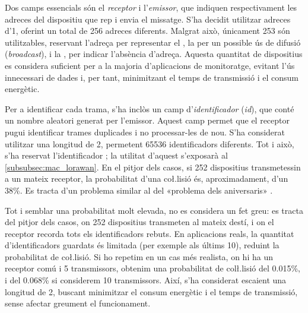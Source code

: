 \documentclass{tfgitic}[2024/07/01]
\begin{document}
Dos camps essencials són el \emph{receptor} i l'\emph{emissor}, que indiquen respectivament les adreces del dispositiu que rep i envia el missatge. S'ha decidit utilitzar adreces d'\SI{1}{\byte}, oferint un total de 256 adreces diferents. Malgrat això, únicament 253 són utilitzables, reservant l'adreça  per representar el , la  per un possible ús de difusió (\emph{broadcast}), i la , per indicar l'absència d'adreça. Aquesta quantitat de dispositius es considera suficient per a la majoria d'aplicacions de monitoratge, evitant l'ús innecessari de dades i, per tant, minimitzant el temps de transmissió i el consum energètic.

Per a identificar cada trama, s'ha inclòs un camp d'\emph{identificador} (\emph{id}), que conté un nombre aleatori generat per l'emissor. Aquest camp permet que el receptor pugui identificar trames duplicades i no processar-les de nou. S'ha considerat utilitzar una longitud de \SI{2}{\byte}, permetent 65536 identificadors diferents. Tot i això, s'ha reservat l'identificador ; la utilitat d'aquest s'exposarà al \autoref{subsubsec:mac_lorawan}. En el pitjor dels casos, si 252 dispositius transmetessin a un mateix receptor, la probabilitat d'una co\l.lisió és, aproximadament, d'un 38\%. Es tracta d'un problema similar al del «problema dels aniversaris» \cite{noauthor_birthday_2025}.

Tot i semblar una probabilitat molt elevada, no es considera un fet greu: es tracta del pitjor dels casos, on 252 dispositius transmeten al mateix destí, i on el receptor recorda tots els identificadors rebuts. En aplicacions reals, la quantitat d'identificadors guardats és limitada (per exemple als últims 10), reduint la probabilitat de co\l.lisió. Si ho repetim en un cas més realista, on hi ha un receptor comú i 5 transmissors, obtenim una probabilitat de col\l.lisió del 0.015\%, i del 0.068\% si considerem 10 transmissors. Així, s'ha considerat escaient una longitud de \SI{2}{\byte}, buscant minimitzar el consum energètic i el temps de transmissió, sense afectar greument el funcionament.
\end{document}
